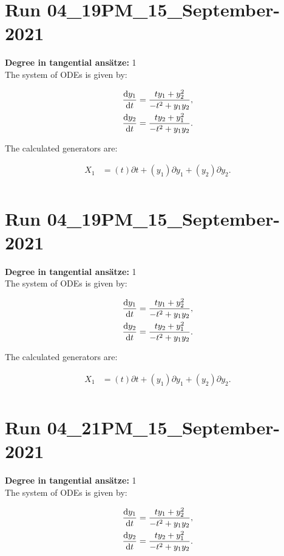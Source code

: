 \section*{Run 04\_19PM\_15\_September-2021}
\textbf{Degree in tangential ansätze:}	1\\
The system of ODEs is given by:

\begin{align*}
\dv{y_{1}}{t}&=\frac{t y_{1} + y_{2}^{2}}{- t^{2} + y_{1} y_{2}},\\
\dv{y_{2}}{t}&=\frac{t y_{2} + y_{1}^{2}}{- t^{2} + y_{1} y_{2}}.\\
\end{align*}

\noindent The calculated generators are:

\begin{align*}
X_{1}&=\left( t \right)\partial t+\left( y_{1} \right)\partial y_{1}+\left( y_{2} \right)\partial y_{2}.\\
\end{align*}
\section*{Run 04\_19PM\_15\_September-2021}
\textbf{Degree in tangential ansätze:}	1\\
The system of ODEs is given by:

\begin{align*}
\dv{y_{1}}{t}&=\frac{t y_{1} + y_{2}^{2}}{- t^{2} + y_{1} y_{2}},\\
\dv{y_{2}}{t}&=\frac{t y_{2} + y_{1}^{2}}{- t^{2} + y_{1} y_{2}}.\\
\end{align*}

\noindent The calculated generators are:

\begin{align*}
X_{1}&=\left( t \right)\partial t+\left( y_{1} \right)\partial y_{1}+\left( y_{2} \right)\partial y_{2}.\\
\end{align*}
\section*{Run 04\_21PM\_15\_September-2021}
\textbf{Degree in tangential ansätze:}	1\\
The system of ODEs is given by:

\begin{align*}
\dv{y_{1}}{t}&=\frac{t y_{1} + y_{2}^{2}}{- t^{2} + y_{1} y_{2}},\\
\dv{y_{2}}{t}&=\frac{t y_{2} + y_{1}^{2}}{- t^{2} + y_{1} y_{2}}.\\
\end{align*}

